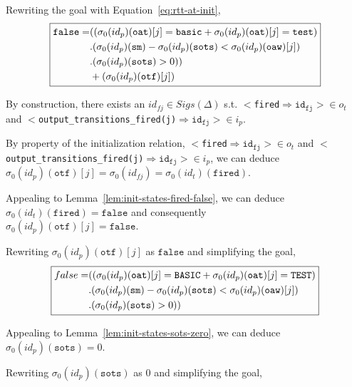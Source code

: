 \documentclass[dvipsnames,12pt]{article}
\begin{document}
\begin{niproof}
\begin{itemize}
    Rewriting the goal with Equation~\eqref{eq:rtt-at-init},
    \begin{equation*}
      \fbox{$\begin{split}
          \mathtt{false}=& ((\sigma_0(id_p)(\texttt{oat})[j]=\mathtt{basic}+\sigma_0(id_p)(\texttt{oat})[j]=\mathtt{test}) \\
          & .(\sigma_0(id_p)(\texttt{sm})-\sigma_0(id_p)(\texttt{sots})<\sigma_0(id_p)(\texttt{oaw})[j])\\
          & .(\sigma_0(id_p)(\texttt{sots})>0))\\
          & +(\sigma_0(id_p)(\texttt{otf})[j]) \\
        \end{split}$}
    \end{equation*}

    By construction, there exists an $id_{fj}\in{}Sigs(\Delta)$ s.t.
    ${<}$\texttt{fired}$\Rightarrow{}\mathtt{id_{fj}}{>}\in{}o_t$
    and
    ${<}$\texttt{output\_transitions\_fired(j)}$\Rightarrow{}\mathtt{id_{fj}}{>}\in{}i_p$.

    By property of the initialization relation,
    ${<}$\texttt{fired}$\Rightarrow{}\mathtt{id_{fj}}{>}\in{}o_t$
    and
    ${<}$\texttt{output\_transitions\_fired(j)}$\Rightarrow{}\mathtt{id_{fj}}{>}\in{}i_p$,
    we can deduce
    $\sigma_0(id_p)(\texttt{otf})[j]=\sigma_0(id_{fj})=\sigma_0(id_t)(\texttt{fired})$.
    
    Appealing to Lemma~\ref{lem:init-states-fired-false}, we can
    deduce $\sigma_0(id_t)(\texttt{fired})=\mathtt{false}$ and consequently\\
    $\sigma_0(id_p)(\texttt{otf})[j]=\mathtt{false}$.

    Rewriting $\sigma_0(id_p)(\texttt{otf})[j]$ as $\mathtt{false}$ and
    simplifying the goal,
    \begin{equation*}
      \fbox{$\begin{split}
          false=& ((\sigma_0(id_p)(\texttt{oat})[j]=\mathtt{BASIC}+\sigma_0(id_p)(\texttt{oat})[j]=\mathtt{TEST}) \\
          & .(\sigma_0(id_p)(\texttt{sm})-\sigma_0(id_p)(\texttt{sots})<\sigma_0(id_p)(\texttt{oaw})[j])\\
          & .(\sigma_0(id_p)(\texttt{sots})>0))\\
        \end{split}$}
    \end{equation*}

    Appealing to Lemma~\ref{lem:init-states-sots-zero}, we can deduce
    $\sigma_0(id_p)(\texttt{sots})=0$.

    Rewriting $\sigma_0(id_p)(\texttt{sots})$ as $0$ and simplifying the
    goal, 
    
  \end{itemize}
\end{niproof}
\end{document}
